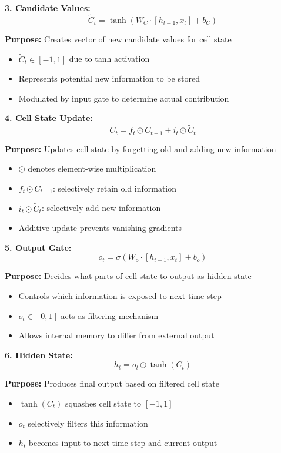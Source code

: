 \documentclass[12pt]{article}
\begin{document}
\begin{enumerate}[(a)]
{    \textbf{3. Candidate Values:}
    $$\tilde{C}_t = \tanh(W_C \cdot [h_{t-1}, x_t] + b_C)$$
    
    \textbf{Purpose:} Creates vector of new candidate values for cell state
    \begin{itemize}
        \item $\tilde{C}_t \in [-1,1]$ due to tanh activation
        \item Represents potential new information to be stored
        \item Modulated by input gate to determine actual contribution
    \end{itemize}
    
    \textbf{4. Cell State Update:}
    $$C_t = f_t \odot C_{t-1} + i_t \odot \tilde{C}_t$$
    
    \textbf{Purpose:} Updates cell state by forgetting old and adding new information
    \begin{itemize}
        \item $\odot$ denotes element-wise multiplication
        \item $f_t \odot C_{t-1}$: selectively retain old information
        \item $i_t \odot \tilde{C}_t$: selectively add new information
        \item Additive update prevents vanishing gradients
    \end{itemize}
    
    \textbf{5. Output Gate:}
    $$o_t = \sigma(W_o \cdot [h_{t-1}, x_t] + b_o)$$
    
    \textbf{Purpose:} Decides what parts of cell state to output as hidden state
    \begin{itemize}
        \item Controls which information is exposed to next time step
        \item $o_t \in [0,1]$ acts as filtering mechanism
        \item Allows internal memory to differ from external output
    \end{itemize}
    
    \textbf{6. Hidden State:}
    $$h_t = o_t \odot \tanh(C_t)$$
    
    \textbf{Purpose:} Produces final output based on filtered cell state
    \begin{itemize}
        \item $\tanh(C_t)$ squashes cell state to $[-1,1]$
        \item $o_t$ selectively filters this information
        \item $h_t$ becomes input to next time step and current output
    \end{itemize}
    
}
\end{enumerate}
\end{document}

